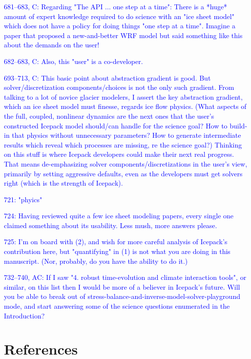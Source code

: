 \documentclass{article}
\theoremstyle{definition}
\theoremstyle{plain}
\begin{document}
\textcolor{blue}{681--683, C:  Regarding "The API ... one step at a time":  There is a *huge* amount of expert knowledge required to do science with an "ice sheet model" which does not have a policy for doing things "one step at a time".  Imagine a paper that proposed a new-and-better WRF model but said something like this about the demands on the user!}

\textcolor{blue}{682--683, C:  Also, this "user" is a co-developer.}

\textcolor{blue}{693--713, C:  This basic point about abstraction gradient is good.  But solver/discretization components/choices is not the only such gradient.  From talking to a lot of novice glacier modelers, I assert the key abstraction gradient, which an ice sheet model must finesse, regards ice flow physics.  (What aspects of the full, coupled, nonlinear dynamics are the next ones that the user's constructed Icepack model should/can handle for the science goal?  How to build-in that physics without unnecessary parameters?  How to generate intermediate results which reveal which processes are missing, re the science goal?)  Thinking on this stuff is where Icepack developers could make their next real progress.  That means de-emphasizing solver components/discretizations in the user's view, primarily by setting aggressive defaults, even as the developers must get solvers right (which is the strength of Icepack).}

\textcolor{blue}{721:  "phyics"}

\textcolor{blue}{724:  Having reviewed quite a few ice sheet modeling papers, every single one claimed something about its usability.  Less mush, more answers please.}

\textcolor{blue}{725:  I'm on board with (2), and wish for more careful analysis of Icepack's contribution here, but "quantifying" in (1) is not what you are doing in this manuscript.  (Nor, probably, do you have the ability to do it.)}

\textcolor{blue}{732--740, AC:  If I saw "4. robust time-evolution and climate interaction tools", or similar, on this list then I would be more of a believer in Icepack's future.  Will you be able to break out of stress-balance-and-inverse-model-solver-playground mode, and start answering some of the science questions enumerated in the Introduction?}



\section*{References}
\end{document}
